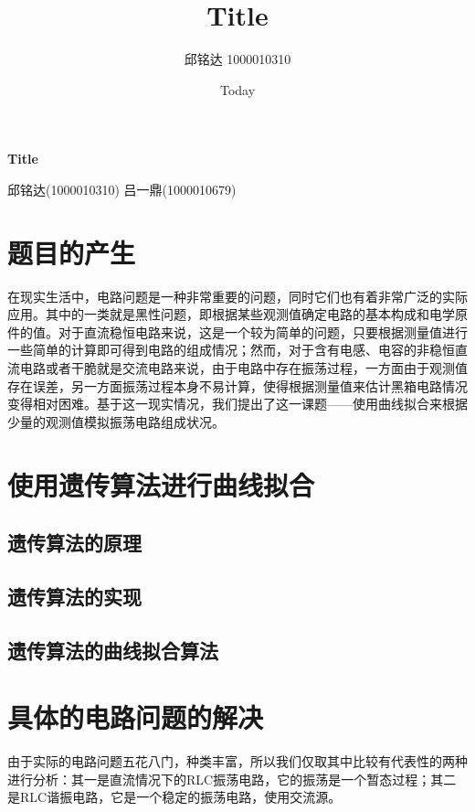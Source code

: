 \documentclass[a4paper]{article}
\begin{document}
\title{Title}
\author{邱铭达 1000010310}
\date{Today}

%
%
\begin{center}
	\Huge \textbf{Title}
\end{center}
\vspace{1 in}
\begin{center}
	\normalsize 邱铭达(1000010310) 吕一鼎(1000010679)
\end{center}
\newpage


\tableofcontents

\section{题目的产生}
在现实生活中，电路问题是一种非常重要的问题，同时它们也有着非常广泛的实际应用。其中的一类就是黑性问题，即根据某些观测值确定电路的基本构成和电学原件的值。对于直流稳恒电路来说，这是一个较为简单的问题，只要根据测量值进行一些简单的计算即可得到电路的组成情况；然而，对于含有电感、电容的非稳恒直流电路或者干脆就是交流电路来说，由于电路中存在振荡过程，一方面由于观测值存在误差，另一方面振荡过程本身不易计算，使得根据测量值来估计黑箱电路情况变得相对困难。基于这一现实情况，我们提出了这一课题——使用曲线拟合来根据少量的观测值模拟振荡电路组成状况。
%
\section{使用遗传算法进行曲线拟合}
\subsection{遗传算法的原理}
\subsection{遗传算法的实现}
\subsection{遗传算法的曲线拟合算法}

\section{具体的电路问题的解决}
由于实际的电路问题五花八门，种类丰富，所以我们仅取其中比较有代表性的两种进行分析：其一是直流情况下的RLC振荡电路，它的振荡是一个暂态过程；其二是RLC谐振电路，它是一个稳定的振荡电路，使用交流源。
\end{document}
